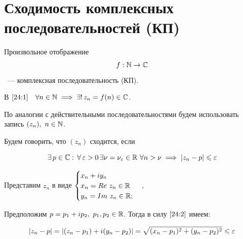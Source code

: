 \documentclass[../../main.tex]{subfiles}
\begin{document}
\section{Сходимость комплексных последовательностей (КП)}

Произвольное отображение
\begin{equation}\label{24:1}
f: \mathbb{N} \to \mathbb{C}
\end{equation}
~--- комплексная последовательность (КП).

В $ \eqref{24:1} \quad \forall n \in \mathbb{N} \implies \exists!\, z_n = f(n) \in \mathbb{C} 
$.

По аналогии с действительными последовательностями будем использовать запись $ 
(z_n),\ n \in \mathbb{N} $.

Будем говорить, что $ (z_n) $ сходится, если

\begin{equation}\label{24:2}
	\exists\, p \in \C :\, \forall\, \eps > 0\, \exists \nu = \nu_\eps \in \R \ 
	\forall n > \nu \implies |z_n - p| \leq \eps
\end{equation}

Представим $ z_n $ в виде
$\begin{cases}
x_n + i y_n  \\
x_n = Re\ z_n \in \mathbb{R} \\
y_n = Im\ z_n \in \mathbb{R};
\end{cases},\ $

Предположим $ p = p_1 + i p_2,\ p_1, p_2 \in \mathbb{R} $. Тогда в силу $ \eqref{24:2} 
$ имеем:

\begin{equation}\label{24:3}
	|z_n - p| = |(z_n - p_1) + i(y_n - p_2)| = \sqrt{(x_n - p_1)^2 + (y_n - 
	p_2)^2} \leqslant \varepsilon
\end{equation}
\end{document}
